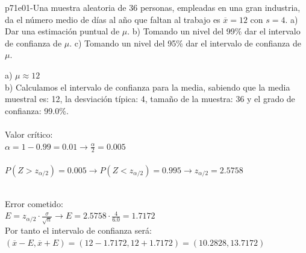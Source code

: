 \documentclass[spanish, 11pt]{exam}
\begin{document}
        \begin{questions}
        \question p71e01-Una muestra aleatoria de 36 personas, empleadas en una gran industria, da el número medio de días al año
que faltan al trabajo es $\overline{x} = 12$ con $s = 4$.
a) Dar una estimación puntual de $\mu$.
b) Tomando un nivel del 99\% dar el intervalo de confianza de $\mu$.
c) Tomando un nivel del 95\% dar el intervalo de confianza de $\mu$. \begin{solution}   a) $\mu\approx 12$ \\ b) Calculamos el intervalo de confianza para la media, sabiendo que la media muestral es: 12, la desviación típica: 4, tamaño de la muestra: 36 y el grado de confianza: 99.0\%. \\ \\ Valor crítico: \\ $\alpha=1-0.99=0.01\to \frac{\alpha}{2}=0.005$ \\ \\ $P(Z>z_{\alpha/2})=0.005\to P(Z<z_{\alpha/2})=0.995 \to z_{\alpha/2} =2.5758$ \\ 
     \\
    Error cometido: \\ $E=z_{\alpha/2}\cdot \frac{\sigma}{\sqrt{n}} \to E=2.5758\cdot \frac{4}{6.0}=1.7172$ \\ Por tanto el intervalo de confianza será: \\$\left(\overline{x} - E , \overline{x} + E \right)=\left(12 - 1.7172 , 12 + 1.7172 \right)=\left(10.2828, 13.7172 \right)$ \\  \\ 
\end{solution}
\end{questions}
\end{document}
